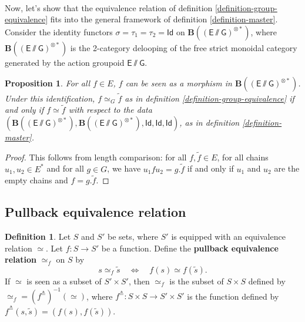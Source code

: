 \documentclass[a4paper,10pt]{article}
\theoremstyle{plain}
\newtheorem{proposition}[theorem]{Proposition}
\theoremstyle{definition}
\newtheorem{definition}[theorem]{Definition}
\theoremstyle{remark}
\begin{document}
\mbox{} \\
Now, let's show that the equivalence relation of definition \ref{definition-group-equivalence} fits into the general framework of definition \ref{definition-master}. \\
Consider the identity functors $\sigma = \tau_1 = \tau_2 = \mathsf{Id}$ on $\mathsf{\textbf{B} \left( (E \sslash G)^{\otimes *} \right) }$, where $\mathsf{\textbf{B}\left( (E \sslash G)^{\otimes*} \right) }$ is the 2-category delooping of the free strict monoidal category generated by the action groupoid $\mathsf{E \sslash G}$.

\begin{proposition}
  For all $f \in E$, $f$ can be seen as a morphism in $\mathsf{\textbf{B} \left( (E \sslash G)^{\otimes *} \right) }$. Under this identification, $f \simeq_G \tilde{f}$ as in definition \ref{definition-group-equivalence} if and only if $f \simeq \tilde{f}$ with respect to the data $(\mathsf{\textbf{B} \left( (E \sslash G)^{\otimes *} \right) },\mathsf{\textbf{B} \left( (E \sslash G)^{\otimes *} \right) },\mathsf{Id},\mathsf{Id},\mathsf{Id})$, as in definition \ref{definition-master}.
\end{proposition}


\begin{proof}
  This follows from length comparison: for all $f, \tilde{f} \in E$, for all chains $u_1,u_2 \in E^*$ and for all $g \in G$, we have $u_1 f u_2 = g.\tilde{f}$ if and only if $u_1$ and $u_2$ are the empty chains and $f = g.\tilde{f}$.
\end{proof}


\subsection{Pullback equivalence relation}

\begin{definition}
  \label{definition-pullback-equivalence-relation}
Let $S$ and $S'$ be sets, where $S'$ is equipped with an equivalence relation $\simeq$. Let $f : S \to S'$ be a function. Define the \textbf{pullback equivalence relation} $\simeq_f$ on $S$ by 
\[
  s \simeq_f \tilde{s} \quad \Longleftrightarrow \quad f(s) \simeq f(\tilde{s}).
\]
If $\simeq$ is seen as a subset of $S' \times S'$, then $\simeq_f$ is the subset of $S \times S$ defined by $\simeq_f = (f^{\triangleq})^{-1}(\simeq)$, where $f^{\triangleq} : S \times S \to S' \times S'$ is the function defined by $f^{\triangleq}(s,\tilde{s}) = (f(s), f(\tilde{s}))$.
\end{definition}
\end{document}
